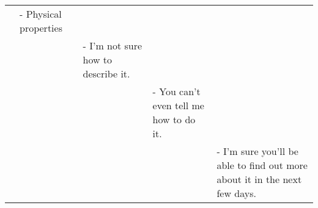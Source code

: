 \begin{longtable}[]{@{}lllll@{}}
\begin{minipage}[t]{0.17\columnwidth}
\strut
\end{minipage} & \begin{minipage}[t]{0.17\columnwidth}\raggedright
- Physical properties\strut
\end{minipage} & \begin{minipage}[t]{0.17\columnwidth}\raggedright
\strut
\end{minipage} & \begin{minipage}[t]{0.17\columnwidth}\raggedright
\strut
\end{minipage} & \begin{minipage}[t]{0.17\columnwidth}\raggedright
\strut
\end{minipage}\tabularnewline
\begin{minipage}[t]{0.17\columnwidth}\raggedright
\strut
\end{minipage} & \begin{minipage}[t]{0.17\columnwidth}\raggedright
\strut
\end{minipage} & \begin{minipage}[t]{0.17\columnwidth}\raggedright
- I'm not sure how to describe it.\strut
\end{minipage} & \begin{minipage}[t]{0.17\columnwidth}\raggedright
\strut
\end{minipage} & \begin{minipage}[t]{0.17\columnwidth}\raggedright
\strut
\end{minipage}\tabularnewline
\begin{minipage}[t]{0.17\columnwidth}\raggedright
\strut
\end{minipage} & \begin{minipage}[t]{0.17\columnwidth}\raggedright
\strut
\end{minipage} & \begin{minipage}[t]{0.17\columnwidth}\raggedright
\strut
\end{minipage} & \begin{minipage}[t]{0.17\columnwidth}\raggedright
- You can't even tell me how to do it.\strut
\end{minipage} & \begin{minipage}[t]{0.17\columnwidth}\raggedright
\strut
\end{minipage}\tabularnewline
\begin{minipage}[t]{0.17\columnwidth}\raggedright
\strut
\end{minipage} & \begin{minipage}[t]{0.17\columnwidth}\raggedright
\strut
\end{minipage} & \begin{minipage}[t]{0.17\columnwidth}\raggedright
\strut
\end{minipage} & \begin{minipage}[t]{0.17\columnwidth}\raggedright
\strut
\end{minipage} & \begin{minipage}[t]{0.17\columnwidth}\raggedright
- I'm sure you'll be able to find out more about it in the next few
days.\strut
\end{minipage}\tabularnewline
\bottomrule
\end{longtable}

